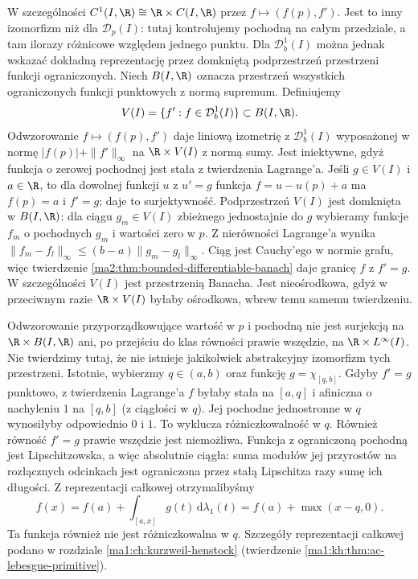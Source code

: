 W szczególności $C^1(I,\R)\cong\R\times C(I,\R)$
przez $f\mapsto(f(p),f')$. Jest to inny izomorfizm
niż dla $\mathcal D_p(I)$: tutaj kontrolujemy
pochodną na całym przedziale, a tam ilorazy
różnicowe względem jednego punktu.
Dla $\mathcal D_b^1(I)$ można jednak wskazać
dokładną reprezentację przez domkniętą
podprzestrzeń przestrzeni funkcji ograniczonych.
Niech $B(I,\R)$ oznacza przestrzeń wszystkich
ograniczonych funkcji punktowych z normą supremum.
Definiujemy
\[
 V(I)=\{f': f\in\mathcal D_b^1(I)\}\subset B(I,\R).
\]
Odwzorowanie $f\mapsto(f(p),f')$ daje liniową
izometrię z $\mathcal D_b^1(I)$ wyposażonej
w normę $|f(p)|+\|f'\|_\infty$ na
$\R\times V(I)$ z normą sumy.
Jest iniektywne, gdyż funkcja o zerowej
pochodnej jest stała z twierdzenia Lagrange'a.
Jeśli $g\in V(I)$ i $a\in\R$, to dla
dowolnej funkcji $u$ z $u'=g$ funkcja
$f=u-u(p)+a$ ma $f(p)=a$ i $f'=g$;
daje to surjektywność. Podprzestrzeń $V(I)$
jest domknięta w $B(I,\R)$: dla ciągu
$g_m\in V(I)$ zbieżnego jednostajnie do $g$
wybieramy funkcje $f_m$ o pochodnych $g_m$
i wartości zero w $p$. Z nierówności Lagrange'a
wynika $\|f_m-f_l\|_\infty\le
(b-a)\|g_m-g_l\|_\infty$.
Ciąg jest Cauchy'ego w normie grafu,
więc twierdzenie
\ref{ma2:thm:bounded-differentiable-banach}
daje granicę $f$ z $f'=g$.
W szczególności $V(I)$ jest przestrzenią Banacha.
Jest nieośrodkowa, gdyż w przeciwnym razie
$\R\times V(I)$ byłaby ośrodkowa, wbrew temu
samemu twierdzeniu.

Odwzorowanie przyporządkowujące wartość w $p$
i pochodną nie jest surjekcją na
$\R\times B(I,\R)$ ani, po przejściu do klas
równości prawie wszędzie, na $\R\times L^\infty(I)$.
Nie twierdzimy tutaj, że nie istnieje jakikolwiek
abstrakcyjny izomorfizm tych przestrzeni.
Istotnie, wybierzmy $q\in(a,b)$ oraz funkcję
$g=\chi_{[q,b]}$. Gdyby $f'=g$ punktowo,
z twierdzenia Lagrange'a $f$ byłaby stała na
$[a,q]$ i afiniczna o nachyleniu $1$ na $[q,b]$
(z ciągłości w $q$). Jej pochodne jednostronne
w $q$ wynosiłyby odpowiednio $0$ i $1$.
To wyklucza różniczkowalność w $q$.
Również równość $f'=g$ prawie wszędzie jest
niemożliwa. Funkcja z ograniczoną pochodną
jest Lipschitzowska, a więc absolutnie ciągła:
suma modułów jej przyrostów na rozłącznych
odcinkach jest ograniczona przez stałą
Lipschitza razy sumę ich długości.
Z reprezentacji całkowej otrzymalibyśmy
\[
 f(x)=f(a)+\int_{[a,x]}g(t)\,\mathrm d\lambda_1(t)
     =f(a)+\max(x-q,0).
\]
Ta funkcja również nie jest różniczkowalna w $q$.
Szczegóły reprezentacji całkowej podano w
rozdziale \ref{ma1:ch:kurzweil-henstock}
(twierdzenie \ref{ma1:kh:thm:ac-lebesgue-primitive}).

